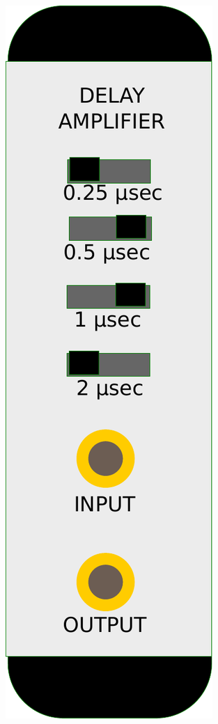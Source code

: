 \begin{figure}[ht]
  \includegraphics[height=0.25\textheight]{BilderAufbau/delay.pdf}

\end{figure}
